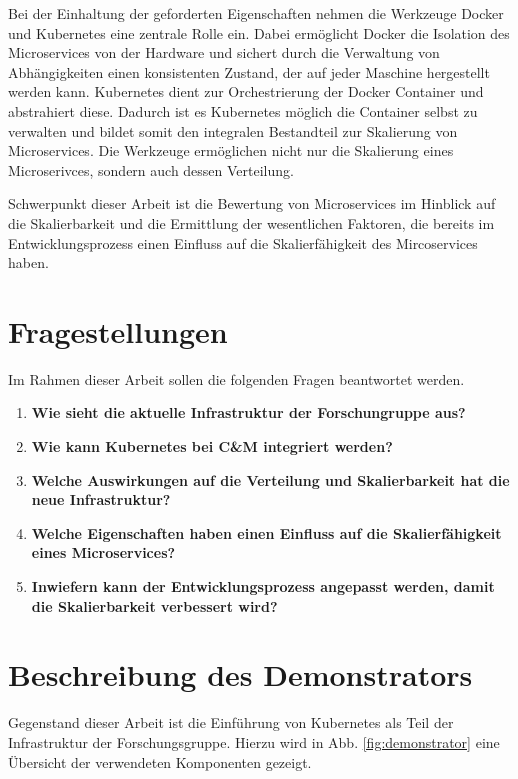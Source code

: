 Bei der Einhaltung der geforderten Eigenschaften nehmen die Werkzeuge Docker und Kubernetes eine zentrale Rolle ein.
Dabei ermöglicht Docker die Isolation des Microservices von der Hardware und sichert durch die Verwaltung von Abhängigkeiten einen konsistenten Zustand, der auf jeder Maschine hergestellt werden kann. 
Kubernetes dient zur Orchestrierung der Docker Container und abstrahiert diese.
Dadurch ist es Kubernetes möglich die Container selbst zu verwalten und bildet somit den integralen Bestandteil zur Skalierung von Microservices.
Die Werkzeuge ermöglichen nicht nur die Skalierung eines Microserivces, sondern auch dessen Verteilung.

Schwerpunkt dieser Arbeit ist die Bewertung von Microservices im Hinblick auf die Skalierbarkeit und die Ermittlung der wesentlichen Faktoren, die bereits im Entwicklungsprozess einen Einfluss auf die Skalierfähigkeit des Mircoservices haben.

\section{Fragestellungen}

Im Rahmen dieser Arbeit sollen die folgenden Fragen beantwortet werden.

\begin{enumerate}
	\item \textbf{Wie sieht die aktuelle Infrastruktur der Forschungruppe aus?}
    \item \textbf{Wie kann Kubernetes bei C\&M integriert werden?}
	\item \textbf{Welche Auswirkungen auf die Verteilung und Skalierbarkeit hat die neue Infrastruktur?}
	\item \textbf{Welche Eigenschaften haben einen Einfluss auf die Skalierfähigkeit eines Microservices?}
	\item \textbf{Inwiefern kann der Entwicklungsprozess angepasst werden, damit die Skalierbarkeit verbessert wird?}
\end{enumerate}

\section{Beschreibung des Demonstrators}


Gegenstand dieser Arbeit ist die Einführung von Kubernetes als Teil der Infrastruktur der Forschungsgruppe.
Hierzu wird in Abb. \ref{fig:demonstrator} eine Übersicht der verwendeten Komponenten gezeigt.


